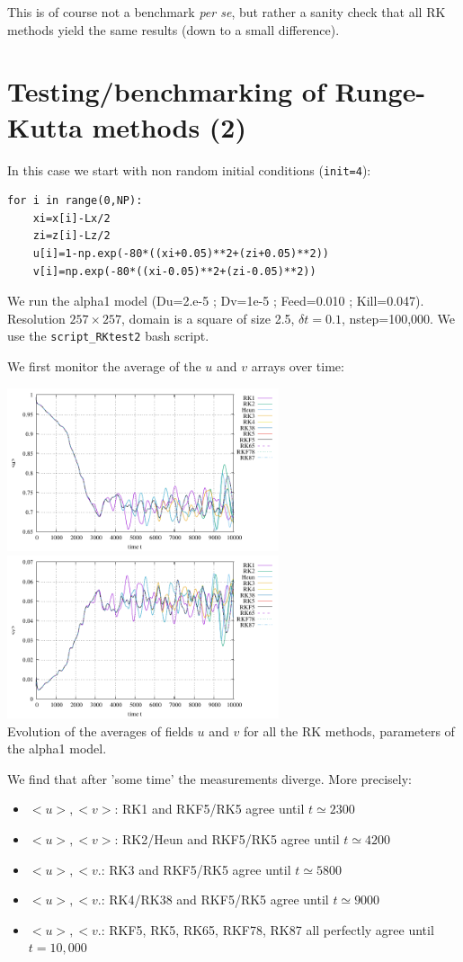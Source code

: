 This is of course not a benchmark {\it per se}, but rather a sanity check that 
all RK methods yield the same results (down to a small difference).


\newpage
\section*{Testing/benchmarking of Runge-Kutta methods (2)}

In this case we start with non random initial conditions (\lstinline{init=4}):
\begin{lstlisting}
for i in range(0,NP):
    xi=x[i]-Lx/2
    zi=z[i]-Lz/2
    u[i]=1-np.exp(-80*((xi+0.05)**2+(zi+0.05)**2))
    v[i]=np.exp(-80*((xi-0.05)**2+(zi-0.05)**2))
\end{lstlisting}
We run the alpha1 model (Du=2.e-5 ; Dv=1e-5 ; Feed=0.010 ; Kill=0.047). 
Resolution $257\times 257$, domain is a square of size 2.5, 
$\delta t=0.1$, nstep=100,000.
We use the {\tt script\_RKtest2} bash script.

We first monitor the average of the $u$ and $v$ arrays over time:
\begin{center}
\includegraphics[width=8cm]{python_codes/fieldstone_171/RKtest2/avrg_u.pdf}
\includegraphics[width=8cm]{python_codes/fieldstone_171/RKtest2/avrg_v.pdf}\\
{\captionfont Evolution of the averages of fields $u$
and $v$ for all the RK methods, parameters of the alpha1 model.}
\end{center}
We find that after 'some time'  the measurements diverge. 
More precisely:
\begin{itemize}
\item $<u>,<v>$: RK1      and RKF5/RK5 agree until $t\simeq 2300$
\item $<u>,<v>$: RK2/Heun and RKF5/RK5 agree until $t\simeq 4200$
\item $<u>,<v.$: RK3      and RKF5/RK5 agree until $t\simeq 5800$
\item $<u>,<v.$: RK4/RK38 and RKF5/RK5 agree until $t\simeq 9000$
\item $<u>,<v.$: RKF5, RK5, RK65, RKF78, RK87 all perfectly agree until $t=10,000$
\end{itemize}


